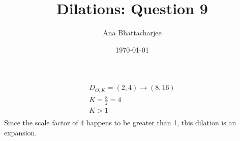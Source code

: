 \documentclass{article}
\begin{document}
\title{Dilations: Question 9}
\author{Ana Bhattacharjee}
\date{\today}
\maketitle{}

\begin{center}
\begin{align}
  D_{O, K} = (2,4) \rightarrow (8, 16) \\
  K = \frac{8}{2} = 4 \\
  K > 1 \\
\end{align}
Since the scale factor of 4 happens to be greater than 1, this dilation is an expansion.
\end{center}
\end{document}
